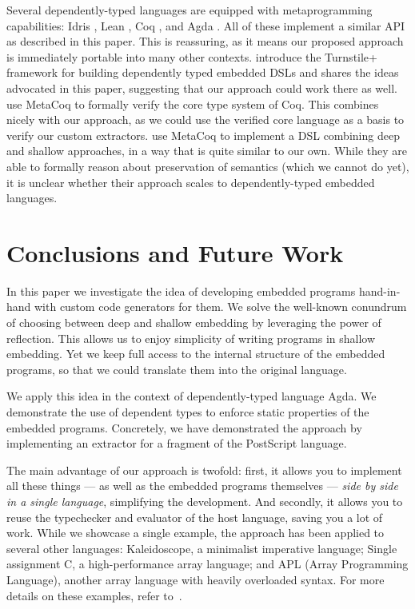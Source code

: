 \documentclass[sigplan,screen,anonymous,review]{acmart}
\begin{document}
Several dependently-typed languages are equipped with metaprogramming
capabilities: Idris \cite{idris-refl}, Lean \cite{lean-refl},
Coq \cite{metacoq}, and Agda \cite{agda-refl}.  All of these
implement a similar API as described in this paper.  This is
reassuring, as it means our proposed approach is immediately portable
into many other contexts.
\citet{10.1145/3371071} introduce the Turnstile+ framework for
building dependently typed embedded DSLs and
shares the ideas advocated in this paper, suggesting that
our approach could work there as well.
\citet{10.1145/3371076} use MetaCoq to formally verify
the core type system of Coq. This combines nicely with
our approach, as we could use the verified core language
as a basis to verify our custom extractors.
\citet{10.1145/3372885.3373829} use MetaCoq to implement
a DSL combining deep and shallow approaches, in a way that
is quite similar to our own. While they are able to formally
reason about preservation of semantics (which we cannot do yet), it is unclear
whether their approach scales to dependently-typed embedded languages.

\section{Conclusions and Future Work} \label{sec:conclusion}


In this paper we investigate the idea of developing
embedded programs hand-in-hand with custom
code generators for them. We solve the well-known
conundrum of choosing between deep and shallow
embedding by leveraging the power of
reflection.
This allows us to enjoy simplicity of writing programs
in shallow embedding.  Yet we keep full access to the internal
structure of the embedded programs, so that we could translate
them into the original language.

We apply this idea in the context of dependently-typed
language Agda.  We demonstrate the use of dependent types
to enforce static properties of the embedded programs.
Concretely, we have demonstrated the approach by implementing
an extractor for a fragment of the PostScript language.

The main advantage of our approach is twofold: first, it allows
you to implement all these things --- as well as the embedded programs
themselves --- \emph{side by side in a single language}, simplifying
the development. And secondly, it allows you to reuse the typechecker
and evaluator of the host language, saving you a lot of work.
While we showcase a single example, the approach has been applied
to several other languages: Kaleidoscope, a minimalist imperative language;
Single assignment C, a high-performance array language; and
APL (Array Programming Language), another array language with
heavily overloaded syntax.
For more details on these examples,
refer to~\citet{DBLP:journals/corr/abs-2105-10819}.
\end{document}

